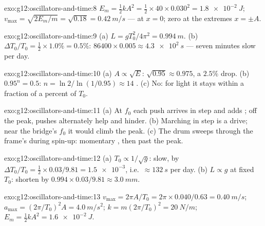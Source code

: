 \begin{solution}{exo:g12:oscillators-and-time:8}
$E_m = \tfrac12 kA^2 = \tfrac12 \times 40 \times 0.030^2 =
\qty{1.8e-2}{J}$; $v_{\max} = \sqrt{2E_m/m} = \sqrt{0.18} =
\qty{0.42}{m/s}$ --- at $x = 0$; zero at the extremes $x = \pm A$.
\end{solution}

\begin{solution}{exo:g12:oscillators-and-time:9}
(a) $L = gT_0^2/4\pi^2 = \qty{0.994}{m}$. (b) $\Delta T_0/T_0 =
\tfrac12 \times 1.0\% = 0.5\%$: $86400 \times 0.005 \approx
\qty{4.3e2}{s}$ --- seven minutes slow per day.
\end{solution}

\begin{solution}{exo:g12:oscillators-and-time:10}
(a) $A \propto \sqrt{E}$: $\sqrt{0.95} \approx 0.975$, a $2.5\%$
drop. (b) $0.95^n = 0.5$: $n = \ln 2/\ln(1/0.95) \approx 14$
. (c) No: for light  it stays within a fraction of a
percent of $T_0$.
\end{solution}

\begin{solution}{exo:g12:oscillators-and-time:11}
(a) At $f_0$ each push arrives in step and adds ; off the peak,
pushes alternately help and hinder. (b) Marching in step is a
 drive; near the bridge's $f_0$ it would climb the 
peak. (c) The drum sweeps through the frame's 
during spin-up: momentary , then past the peak.
\end{solution}

\begin{solution}{exo:g12:oscillators-and-time:12}
(a) $T_0 \propto 1/\sqrt{g}$: slow, by $\Delta T_0/T_0 = \tfrac12
\times 0.03/9.81 = \num{1.5e-3}$, i.e.\ $\approx \qty{132}{s}$ per
day. (b) $L \propto g$ at fixed $T_0$: shorten by $0.994 \times
0.03/9.81 \approx \qty{3.0}{mm}$.
\end{solution}

\begin{solution}{exo:g12:oscillators-and-time:13}
$v_{\max} = 2\pi A/T_0 = 2\pi \times 0.040/0.63 = \qty{0.40}{m/s}$;
$a_{\max} = (2\pi/T_0)^2 A = \qty{4.0}{m/s^2}$; $k = m(2\pi/T_0)^2
= \qty{20}{N/m}$; $E_m = \tfrac12 kA^2 = \qty{1.6e-2}{J}$.
\end{solution}

